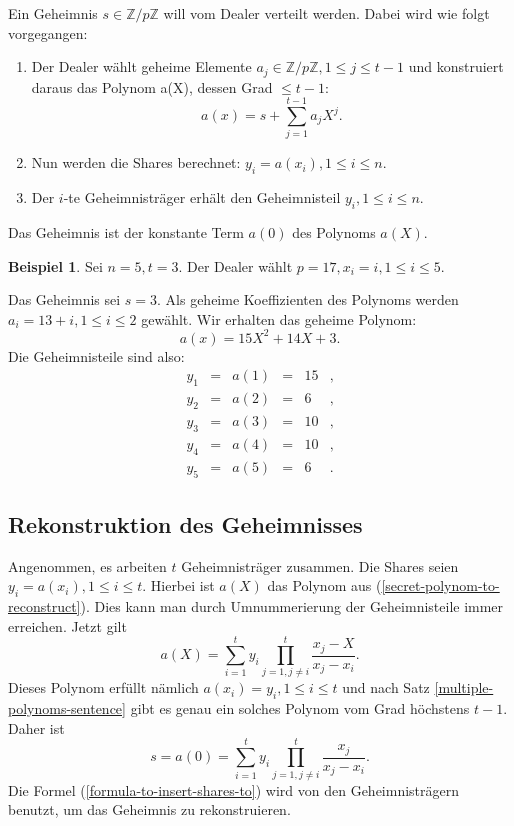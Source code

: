 \documentclass[12pt, a4paper, oneside, titlepage]{report}
\newcommand{\Z}{\mathds{Z}}
\theoremstyle{definition}
\newtheorem{bsp}[lemma]{Beispiel}
\begin{document}
	Ein Geheimnis $ s \in \Z / p \Z $ will vom Dealer verteilt werden. Dabei wird wie folgt vorgegangen:
	
	\begin{enumerate}
		\item {
			Der Dealer wählt geheime Elemente $ a_j \in \Z / p \Z, 1 \leq j \leq t - 1 $ und konstruiert daraus das Polynom a(X), dessen Grad $ \leq t-1 $:
			\begin{equation}\label{secret-polynom-to-reconstruct}
			a(x) = s + \sum_{j=1}^{t-1} a_jX^j.
			\end{equation}
		}
		\item {
			Nun werden die Shares berechnet: $ y_i = a(x_i), 1 \leq i \leq n $.
		}
		\item {
			Der $ i $-te Geheimnisträger erhält den Geheimnisteil $ y_i, 1 \leq i \leq n $.
		}
	\end{enumerate}
	Das Geheimnis ist der konstante Term $ a(0) $ des Polynoms $ a(X) $.
	\begin{bsp}\label{shares-example}
		Sei $ n = 5, t = 3 $. Der Dealer wählt $ p = 17, x_i = i, 1 \leq i \leq 5 $.
		
		Das Geheimnis sei $ s = 3 $. Als geheime Koeffizienten des Polynoms werden $ a_i = 13 + i, 1 \leq i \leq 2 $ gewählt. Wir erhalten das geheime Polynom:
		$$ a(x) = 15 X^2 + 14X + 3. $$
		Die Geheimnisteile sind also:
		$$\begin{array}{cccccc}
			y_1 & = & a(1) & = & 15 & , \\
			y_2 & = & a(2) & = & 6 & , \\
			y_3 & = & a(3) & = & 10 & , \\
			y_4 & = & a(4) & = & 10 & , \\
			y_5 & = & a(5) & = & 6 & .
		\end{array}$$
	\end{bsp}
	
	\subsection{Rekonstruktion des Geheimnisses}
	
	Angenommen, es arbeiten $ t $ Geheimnisträger zusammen. Die Shares seien $ y_i = a(x_i), 1 \leq i \leq t $. Hierbei ist $ a(X) $ das Polynom aus (\ref{secret-polynom-to-reconstruct}). Dies kann man durch Umnummerierung der Geheimnisteile immer erreichen. Jetzt gilt
	$$ a(X) = \sum_{i=1}^{t} y_i \prod_{j=1, j \neq i}^{t} \frac{x_j - X}{x_j - x_i} . $$
	Dieses Polynom erfüllt nämlich $ a(x_i) = y_i, 1 \leq i \leq t $ und nach Satz \ref{multiple-polynoms-sentence} gibt es genau ein solches Polynom vom Grad höchstens $ t - 1 $. Daher ist
	\begin{equation}\label{formula-to-insert-shares-to}
		s = a(0) = \sum_{i=1}^{t} y_i \prod_{j=1, j \neq i}^{t} \frac{x_j}{x_j - x_i} .
	\end{equation}
	Die Formel (\ref{formula-to-insert-shares-to}) wird von den Geheimnisträgern benutzt, um das Geheimnis zu rekonstruieren.
	
\end{document}
